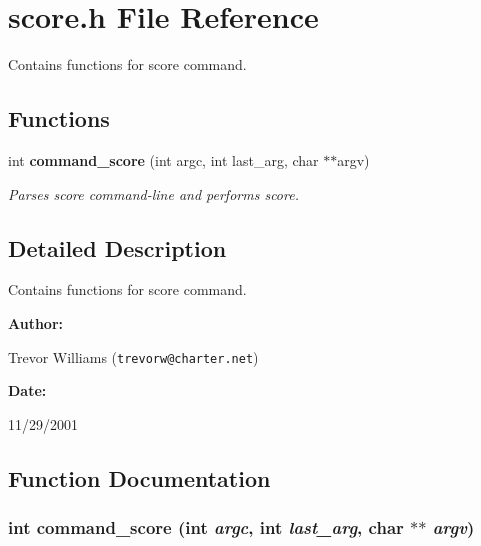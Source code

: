 \section{score.h File Reference}
\label{score_8h}
Contains functions for score command. 


\subsection*{Functions}
\begin{CompactItemize}
\item 
int {\bf command\_\-score} (int argc, int last\_\-arg, char $\ast$$\ast$argv)
\begin{CompactList}\small\item\em Parses score command-line and performs score.\item\end{CompactList}\end{CompactItemize}


\subsection{Detailed Description}
Contains functions for score command.



\begin{Desc}
\item[{\bf Author: }]\par
Trevor Williams ({\tt trevorw@charter.net}) \end{Desc}
\begin{Desc}
\item[{\bf Date: }]\par
11/29/2001

\end{Desc}


\subsection{Function Documentation}
\subsubsection{\setlength{\rightskip}{0pt plus 5cm}int command\_\-score (int {\em argc}, int {\em last\_\-arg}, char $\ast$$\ast$ {\em argv})}\label{score_8h_a0}


